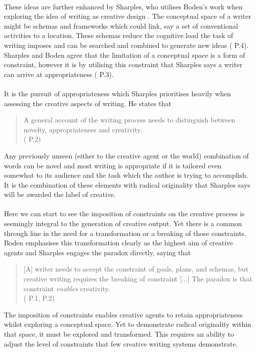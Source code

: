 \documentclass[letterpaper]{article}
\begin{document}
\\These ideas are further enhanced by Sharples, who utilises Boden's work when exploring the idea of writing as creative design . The conceptual space of a writer might be schemas and frameworks which could link, say a set of conventional activities to a location. These schemas reduce the cognitive load the task of writing imposes and can be searched and combined to generate new ideas ( P.4). Sharples and Boden agree that the limitation of a conceptual space is a form of constraint, however it is by utilising this constraint that Sharples says a writer can arrive at appropriateness ( P.3).\\ 
\\It is the pursuit of appropriateness which Sharples prioritises heavily when assessing the creative aspects of writing. He states that 
\begin{quote}
A general account of the writing process needs to distinguish between novelty, appropriateness and creativity.\\
( P.2)
\end{quote}
Any previously unseen (either to the creative agent or the world) combination of words can be novel and most writing is appropriate if it is tailored even somewhat to its audience and the task which the author is trying to accomplish. It is the combination of these elements with radical originality that Sharples says will be awarded the label of creative.\\ 
\\Here we can start to see the imposition of constraints on the creative process is seemingly integral to the generation of creative output. Yet there is a common through line in the need for a transformation or a breaking of those constraints. Boden emphasises this transformation clearly as the highest aim of creative agents and Sharples engages the paradox directly, saying that
\begin{quote}
[A] writer needs to accept the constraint of goals, plans, and schemas, but creative writing requires the breaking of constraint [...] The paradox is that constraint \emph{enables} creativity.\\
( P.1, P.2)
\end{quote}
The imposition of constraints enables creative agents to retain appropriateness whilst exploring a conceptual space. Yet to demonstrate radical originality within that space, it must be explored and transformed. This requires an ability to adjust the level of constraints that few creative writing systems demonstrate.\\
\end{document}
